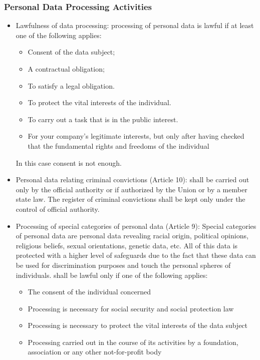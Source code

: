 \subsubsection{Personal Data Processing Activities}
\begin{itemize}
    \item Lawfulness of data processing: processing of personal data is lawful if at least one of the following applies:
    \begin{itemize}
        \item Consent of the data subject;
        \item A contractual obligation;
        \item To satisfy a legal obligation.
        \item To protect the vital interests of the individual.
        \item To carry out a task that is in the public interest.
        \item For your company’s legitimate interests, but only after having checked that the fundamental rights and freedoms of the individual
    \end{itemize}
    In this case consent is not enough.
    \item Personal data relating criminal convictions (Article 10): shall be carried out only by the official authority or if authorized by the Union or by a member state law. The register of criminal convictions shall be kept only under the control of official authority.
    \item Processing of special categories of personal data (Article 9): 
    Special categories of personal data are personal data revealing racial origin, political opinions, religious beliefs, sexual orientations, genetic data, etc. All of this data is protected with a higher level of safeguards due to the fact that these data can be used for discrimination purposes and touch the personal spheres of individuals. 
    shall be lawful only if one of the following applies:
    \begin{itemize}
        \item The consent of the individual concerned
        \item Processing is necessary for social security and social protection law
        \item Processing is necessary to protect the vital interests of the data subject
        \item Processing carried out in the course of its activities by a foundation, association or any other not-for-profit body

\end{itemize}
\end{itemize}
